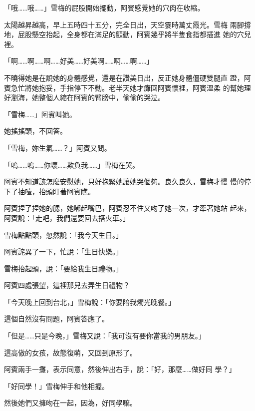 「哦……哦……」雪梅的屁股開始擺動，阿賓感覺她的穴肉在收縮。

太陽越昇越高，早上五時四十五分，完全日出，天空霎時萬丈霞光。雪梅
兩腳撐地，屁股懸空抬起，全身都在滿足的顫動，阿賓幾乎將半隻食指都插進
她的穴兒裡。

「啊……啊……啊……好美……好美啊……啊……啊……」

不曉得她是在說她的身體感覺，還是在讚美日出，反正她身體僵硬雙腿直
蹬，阿賓急忙將她抱妥，手指停下不動。老半天她才癱回阿賓懷裡，阿賓溫柔
的幫她理好瀏海，她整個人縮在阿賓的臂膀中，偷偷的哭泣。

「雪梅……」阿賓叫她。

她搖搖頭，不回答。

「雪梅，妳生氣……？」阿賓又問。

「嗚……嗚……你壞……欺負我……」雪梅在哭。

阿賓不知道該怎麼安慰她，只好抱緊她讓她哭個夠。良久良久，雪梅才慢
慢的停下了抽噎，抬頭盯著阿賓瞧。

阿賓捏了捏她的腮，她嘟起嘴巴，阿賓忍不住又吻了她一次，才牽著她站
起來，阿賓說：「走吧，我們還要回去搭火車。」

雪梅點點頭，忽然說：「我今天生日。」

阿賓詫異了一下，忙說：「生日快樂。」

雪梅抬起頭，說：「要給我生日禮物。」

阿賓四處張望，這裡那兒去弄生日禮物？

「今天晚上回到台北，」雪梅說：「你要陪我燭光晚餐。」

這個自然沒有問題，阿賓答應了。

「但是……只是今晚，」雪梅又說：「我可沒有要你當我的男朋友。」

這高傲的女孩，故態復萌，又回到原形了。

阿賓兩手一攤，表示同意，然後伸出右手，說：「好，那麼……做好同
學？」

「好同學！」雪梅伸手和他相握。

然後她們又擁吻在一起，因為，好同學嘛。










